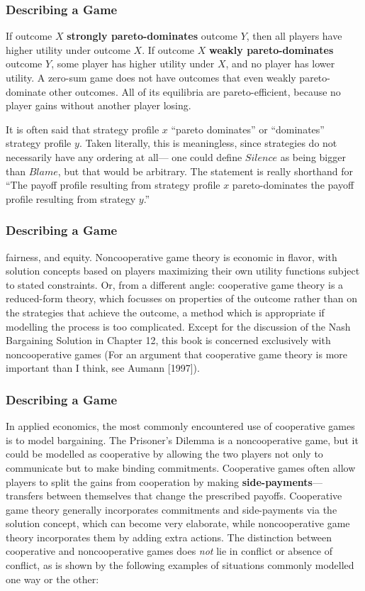  \begin{frame}[fragile]\frametitle{Describing a Game}
 
 If outcome $X$ {\bf strongly pareto-dominates}
outcome $Y$, then all players have higher utility under outcome $X$. If outcome
$X$ {\bf weakly pareto-dominates} outcome $Y$, some player has higher utility
under $X$, and no player has lower utility. A zero-sum game does not have
outcomes that even weakly pareto-dominate other outcomes. All of  its equilibria
are pareto-efficient, because no player gains without another player losing.

  It is often said that    strategy profile $x$ ``pareto dominates''  or
``dominates''   strategy profile $y$. Taken literally, this is meaningless,
since strategies do not necessarily have any ordering at all--- one could define
$Silence$ as being  bigger than $Blame$, but that would be arbitrary.   The
statement is really   shorthand for   ``The payoff profile resulting from
strategy profile $x$ pareto-dominates the payoff profile resulting from strategy
$y$.'' 

\end{frame}

 \begin{frame}[fragile]\frametitle{Describing a Game}
 fairness, and equity.  Noncooperative game theory is economic in
flavor, with solution concepts based on players maximizing their own utility
functions subject to stated constraints. Or,  from a different angle:
cooperative game theory is a reduced-form theory, which  focusses on properties
of the outcome rather than on the strategies that achieve the outcome, a method
which is appropriate if  modelling the process  is too complicated.      Except
for the discussion of the Nash Bargaining Solution in Chapter 12,  this book is
concerned
exclusively with noncooperative games (For  an argument that     cooperative
game theory is more important than I think,  see   Aumann [1997]).
\end{frame}

 \begin{frame}[fragile]\frametitle{Describing a Game}
  In applied economics, the most commonly encountered use of cooperative games
is to model bargaining.  The  Prisoner's Dilemma is a noncooperative game, but
it could be modelled as cooperative by allowing the two players not only to
communicate  but to make binding commitments. Cooperative games often allow
players to split the gains from cooperation by making {\bf side-payments}---
transfers between themselves that change the prescribed payoffs.  Cooperative
game theory generally incorporates commitments and side-payments via the
solution concept, which can become very elaborate, while noncooperative game
theory incorporates them by adding extra actions. The distinction between
cooperative and noncooperative games does {\it not} lie in conflict or absence
of conflict, as is shown by the following examples of situations commonly
modelled one way or the other:
\end{frame}


